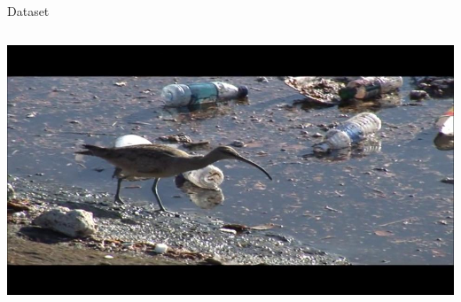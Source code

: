 \documentclass{beamer}
\begin{document}
\begin{frame}{Dataset}
\begin{columns}[c]
\begin{column}{.4\textwidth}
                \includegraphics[width=\textwidth]{images/9077_11.jpg}\\
            \end{column}
        \end{columns}
    \end{frame}
\end{document}

